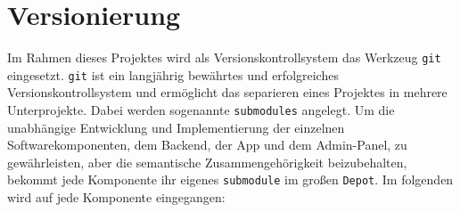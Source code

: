 \section{Versionierung}

Im Rahmen dieses Projektes wird als Versionskontrollsystem das Werkzeug \verb#git# eingesetzt.
\verb#git# ist ein langjährig bewährtes und erfolgreiches Versionskontrollsystem und ermöglicht das separieren eines Projektes in mehrere Unterprojekte.
Dabei werden sogenannte \verb#submodules# angelegt.
Um die unabhängige Entwicklung und Implementierung der einzelnen Softwarekomponenten, dem Backend, der App und dem Admin-Panel, zu gewährleisten, aber die semantische Zusammengehörigkeit beizubehalten,
bekommt jede Komponente ihr eigenes \verb#submodule# im großen \verb#Depot#.
Im folgenden wird auf jede Komponente eingegangen: